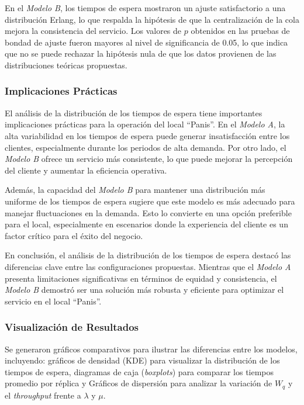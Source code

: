 \documentclass[a4paper,12pt]{article}
\begin{document}
En el \textit{Modelo B}, los tiempos de espera mostraron un ajuste satisfactorio a una distribución Erlang, lo que respalda la hipótesis de que la centralización de la cola mejora la consistencia del servicio. Los valores de \( p \) obtenidos en las pruebas de bondad de ajuste fueron mayores al nivel de significancia de 0.05, lo que indica que no se puede rechazar la hipótesis nula de que los datos provienen de las distribuciones teóricas propuestas.

\subsubsection{Implicaciones Prácticas}

El análisis de la distribución de los tiempos de espera tiene importantes implicaciones prácticas para la operación del local “Panis”. En el \textit{Modelo A}, la alta variabilidad en los tiempos de espera puede generar insatisfacción entre los clientes, especialmente durante los periodos de alta demanda. Por otro lado, el \textit{Modelo B} ofrece un servicio más consistente, lo que puede mejorar la percepción del cliente y aumentar la eficiencia operativa.

Además, la capacidad del \textit{Modelo B} para mantener una distribución más uniforme de los tiempos de espera sugiere que este modelo es más adecuado para manejar fluctuaciones en la demanda. Esto lo convierte en una opción preferible para el local, especialmente en escenarios donde la experiencia del cliente es un factor crítico para el éxito del negocio.

En conclusión, el análisis de la distribución de los tiempos de espera destacó las diferencias clave entre las configuraciones propuestas. Mientras que el \textit{Modelo A} presenta limitaciones significativas en términos de equidad y consistencia, el \textit{Modelo B} demostró ser una solución más robusta y eficiente para optimizar el servicio en el local “Panis”.

\subsubsection{Visualización de Resultados}

Se generaron gráficos comparativos para ilustrar las diferencias entre los modelos, incluyendo: gráficos de densidad (KDE) para visualizar la distribución de los tiempos de espera, diagramas de caja (\textit{boxplots}) para comparar los tiempos promedio por réplica y Gráficos de dispersión para analizar la variación de $W_q$ y el \textit{throughput} frente a $\lambda$ y $\mu$.
\end{document}

